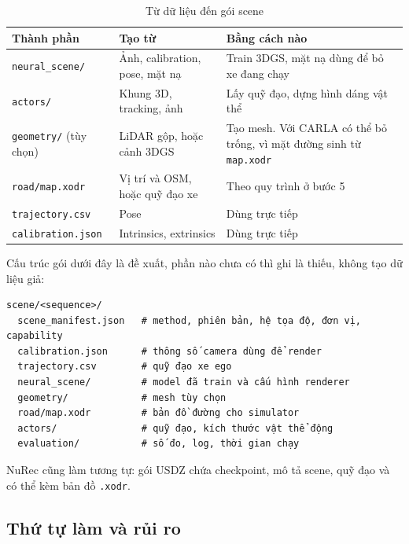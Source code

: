 \begin{table}[H]
  \centering
  \small
  \caption{Từ dữ liệu đến gói scene}
  \begin{tabularx}{\linewidth}{>{\raggedright\arraybackslash}p{3.1cm} >{\raggedright\arraybackslash}X >{\raggedright\arraybackslash}X}
    \toprule
    \textbf{Thành phần} & \textbf{Tạo từ} & \textbf{Bằng cách nào} \\
    \midrule
    \texttt{neural\_scene/} & Ảnh, calibration, pose, mặt nạ & Train 3DGS, mặt nạ dùng để bỏ xe đang chạy \\
    \addlinespace
    \texttt{actors/} & Khung 3D, tracking, ảnh & Lấy quỹ đạo, dựng hình dáng vật thể \\
    \addlinespace
    \texttt{geometry/} (tùy chọn) & LiDAR gộp, hoặc cảnh 3DGS & Tạo mesh. Với CARLA có thể bỏ trống, vì mặt đường sinh từ \texttt{map.xodr} \\
    \addlinespace
    \texttt{road/map.xodr} & Vị trí và OSM, hoặc quỹ đạo xe & Theo quy trình ở bước 5 \\
    \addlinespace
    \texttt{trajectory.csv} & Pose & Dùng trực tiếp \\
    \addlinespace
    \texttt{calibration.json} & Intrinsics, extrinsics & Dùng trực tiếp \\
    \bottomrule
  \end{tabularx}
\end{table}

Cấu trúc gói dưới đây là đề xuất, phần nào chưa có thì ghi là thiếu, không tạo dữ liệu giả:

\begin{lstlisting}[numbers=none, morecomment={[l]\#}, texcl=true, caption={Cấu trúc gói scene (đề xuất)}, breaklines=false]
scene/<sequence>/
  scene_manifest.json   # method, phiên bản, hệ tọa độ, đơn vị, capability
  calibration.json      # thông số camera dùng để render
  trajectory.csv        # quỹ đạo xe ego
  neural_scene/         # model đã train và cấu hình renderer
  geometry/             # mesh tùy chọn
  road/map.xodr         # bản đồ đường cho simulator
  actors/               # quỹ đạo, kích thước vật thể động
  evaluation/           # số đo, log, thời gian chạy
\end{lstlisting}

NuRec cũng làm tương tự: gói USDZ chứa checkpoint, mô tả scene, quỹ đạo và có thể kèm bản đồ \texttt{.xodr}.

\subsection{Thứ tự làm và rủi ro}

